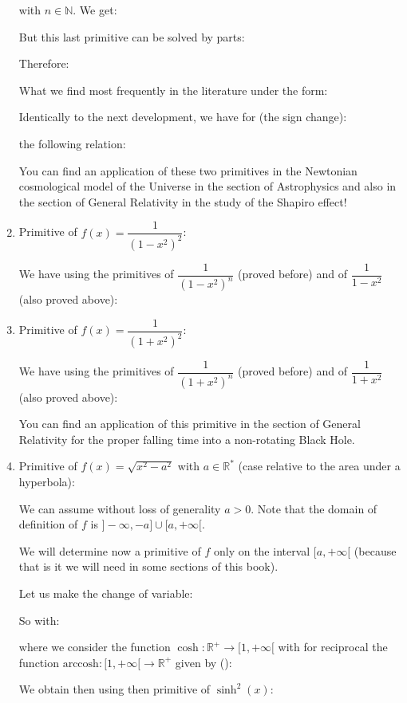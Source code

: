 \begin{enumerate}
		with $n \in \mathbb{N}$. We get:
		
		But this last primitive can be solved by parts:
		
		Therefore:
		
		What we find most frequently in the literature under the form:
		
		Identically to the next development, we have for (the sign change):
		
		the following relation:
		
		You can find an application of these two primitives in the Newtonian cosmological model of the Universe in the section of Astrophysics and also in the section of General Relativity in the study of the Shapiro effect!
		
		\item Primitive of $f(x)=\dfrac{1}{(1-x^2)^2}$:
		
		We have using the primitives of $\dfrac{1}{(1-x^2)^n}$ (proved before) and of $\dfrac{1}{1-x^2}$ (also proved above):
		
		
		\item Primitive of $f(x)=\dfrac{1}{(1+x^2)^2}$\label{black hole primitive}:
		
		We have using the primitives of $\dfrac{1}{(1+x^2)^n}$ (proved before) and of $\dfrac{1}{1+x^2}$ (also proved above):
		
		
		You can find an application of this primitive in the section of General Relativity for the proper falling time into a non-rotating Black Hole.
		
		\item Primitive of $f(x)=\sqrt{x^2-a^2}$ with $a\in \mathbb{R}^*$ (case relative to the area under a hyperbola):
		
		We can assume without loss of generality $a>0$. Note that the domain of definition of $f$ is $]-\infty,-a] \cup [a,+\infty[$.
		
		We will determine now a primitive of $f$ only on the interval $[a,+\infty[$ (because that is it we will need in some sections of this book).
		
		Let us make the change of variable:
		
		So with:
		
		where we consider the function $\cosh: \mathbb{R}^+ \rightarrow [1,+\infty[$ with for reciprocal the function $\text{arccosh}:[1,+\infty[ \rightarrow \mathbb{R}^+$ given by ():
		
		We obtain then using then primitive of $\sinh^2(x)$:
		

\end{enumerate}
